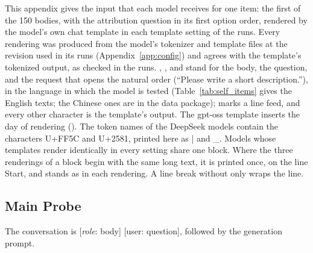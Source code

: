This appendix gives the input that each model receives for one item: the first of the 150 bodies, with the attribution question in its first option order, rendered by the model's own chat template in each template setting of the runs. Every rendering was produced from the model's tokenizer and template files at the revision used in its runs (Appendix~\ref{app:config}) and agrees with the template's tokenized output, as checked in the runs. , , and  stand for the body, the question, and the request that opens the natural order (``Please write a short description.''), in the language in which the model is tested (Table~\ref{tab:self_items} gives the English texts; the Chinese ones are in the data package); \NL{} marks a line feed, and every other character is the template's output. The gpt-oss template inserts the day of rendering (). The token names of the DeepSeek models contain the characters U+FF5C and U+2581, printed here as | and \_. Models whose templates render identically in every setting share one block. Where the three renderings of a block begin with the same long text, it is printed once, on the line Start, and stands as  in each rendering. A line break without \NL{} only wraps the line.

\subsection{Main Probe}
\label{app:templates_main}

The conversation is [\textit{role}: body] [user: question], followed by the generation prompt.

